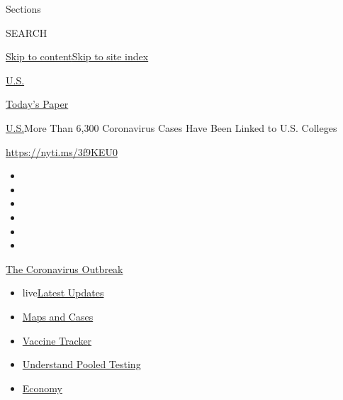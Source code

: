 Sections

SEARCH

\protect\hyperlink{site-content}{Skip to
content}\protect\hyperlink{site-index}{Skip to site index}

\href{https://www.nytimes3xbfgragh.onion/section/us}{U.S.}

\href{https://myaccount.nytimes3xbfgragh.onion/auth/login?response_type=cookie\&client_id=vi}{}

\href{https://www.nytimes3xbfgragh.onion/section/todayspaper}{Today's
Paper}

\href{/section/us}{U.S.}\textbar{}More Than 6,300 Coronavirus Cases Have
Been Linked to U.S. Colleges

\url{https://nyti.ms/3f9KEU0}

\begin{itemize}
\item
\item
\item
\item
\item
\item
\end{itemize}

\href{https://www.nytimes3xbfgragh.onion/news-event/coronavirus?action=click\&pgtype=Article\&state=default\&region=TOP_BANNER\&context=storylines_menu}{The
Coronavirus Outbreak}

\begin{itemize}
\tightlist
\item
  live\href{https://www.nytimes3xbfgragh.onion/2020/07/29/world/coronavirus-covid-19.html?action=click\&pgtype=Article\&state=default\&region=TOP_BANNER\&context=storylines_menu}{Latest
  Updates}
\item
  \href{https://www.nytimes3xbfgragh.onion/interactive/2020/us/coronavirus-us-cases.html?action=click\&pgtype=Article\&state=default\&region=TOP_BANNER\&context=storylines_menu}{Maps
  and Cases}
\item
  \href{https://www.nytimes3xbfgragh.onion/interactive/2020/science/coronavirus-vaccine-tracker.html?action=click\&pgtype=Article\&state=default\&region=TOP_BANNER\&context=storylines_menu}{Vaccine
  Tracker}
\item
  \href{https://www.nytimes3xbfgragh.onion/interactive/2020/07/27/upshot/coronavirus-pooled-testing.html?action=click\&pgtype=Article\&state=default\&region=TOP_BANNER\&context=storylines_menu}{Understand
  Pooled Testing}
\item
  \href{https://www.nytimes3xbfgragh.onion/live/2020/07/29/business/stock-market-today-coronavirus?action=click\&pgtype=Article\&state=default\&region=TOP_BANNER\&context=storylines_menu}{Economy}
\end{itemize}

